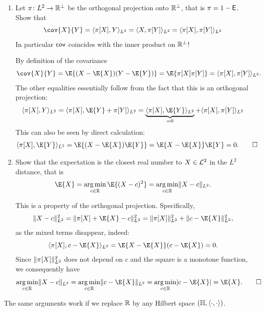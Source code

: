 \begin{exercise}
\begin{enumerate}[label=(\alph*), noitemsep]
        \item Let \(\pi \colon L^2 \to \mathbb{R}^\perp\) be the orthogonal projection
        onto \(\mathbb{R}^\perp\), that is \(\pi = 1 - \mathsf{E}\). Show that
        \[
            \cov{X}{Y}
            = \scp{\pi[X], Y}_{L^2}
            = \scp{X, \pi[Y]}_{L^2}
            = \scp{\pi[X], \pi[Y]}_{L^2}
        \]
        In particular \(\mathsf{cov}\) coincides with the inner product on \(\mathbb{R}^\perp\)!
        \begin{solution}
            By definition of the covariance
            \[
                \cov{X}{Y}
                = \E{(X-\E{X})(Y-\E{Y})}
                = \E{\pi[X]\pi[Y]} = \scp{\pi[X], \pi[Y]}_{L^2}.
            \]
            The other equalities essentially follow from the fact that this is an
            orthogonal projection:
            \[
                \scp{\pi[X], Y}_{L^2}
                = \scp{\pi[X], \E{Y} + \pi[Y]}_{L^2}
                = \underbrace{\scp{\pi[X], \E{Y}}_{L^2}}_{=0} + \scp{\pi[X], \pi[Y]}_{L^2}
            \]
            This can also be seen by direct calculation:
            \[
                \scp{\pi[X], \E{Y}}_{L^2} = \E{(X-\E{X})\E{Y}} = \E{X -\E{X}}\E{Y} = 0.
                \qedhere
            \]
        \end{solution}

        \item Show that the expectation is the closest real number to \(X\in
        \mathcal{L}^2\) in the \(L^2\) distance, that is
        \[
            \E{X} = \argmin_{c\in \real} \E{(X - c)^2} = \argmin_{c\in \real} \norm{X - c}_{L^2}.
        \]
        \begin{solution}
            This is a property of the orthogonal projection. Specifically,
            \[
                \norm{X - c}_{L^2}^2
                = \norm{\pi[X] + \E{X} - c}_{L^2}^2
                = \norm{\pi[X]}_{L^2}^2 + \norm{c-\E{X}}_{L^2}^2,
            \]
            as the mixed terms disappear, indeed:
            \[
                \scp{\pi[X], c-\E{X}}_{L^2} = \E{X - \E{X}}(c-\E{X}) = 0.
            \]
            Since \(\lVert\pi[X]\rVert_{L^2}^2\) does not depend on \(c\) and the
            square is a monotone function, we consequently have
            \[
                \argmin_{c\in \real} \norm{X - c}_{L^2}
                = \argmin_{c\in \real} \norm{c-\E{X}}_{L^2}
                = \argmin_{c\in \real} \abs{c-\E{X}}
                = \E{X}.
                \qedhere
            \]
        \end{solution}
    \end{enumerate}
    \begin{remark}
        The same arguments work if we replace \(\mathbb{R}\) by any Hilbert space
        \((\mathbb{H}, \langle\cdot, \cdot\rangle)\).
    \end{remark}
\end{exercise}

